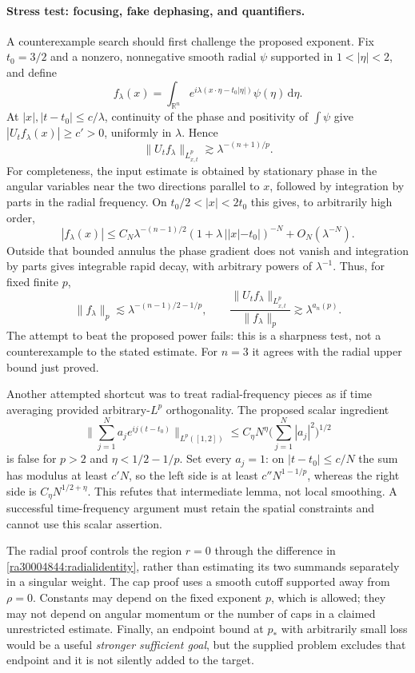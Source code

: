 \documentclass[11pt]{article}
\newcommand{\R}{\mathbb{R}}
\newcommand{\dd}{\,\mathrm d}
\begin{document}
	\paragraph{Stress test: focusing, fake dephasing, and quantifiers.}
	A counterexample search should first challenge the proposed exponent.
	Fix $t_0=3/2$ and a nonzero, nonnegative smooth radial $\psi$ supported
	in $1<|\eta|<2$, and define
	\[
	f_\lambda(x)=\int_{\R^n}
	e^{i\lambda(x\cdot\eta-t_0|\eta|)}\psi(\eta)\dd\eta.
	\]
	At $|x|,|t-t_0|\leq c/\lambda$, continuity of the phase and positivity
	of $\int\psi$ give $|U_tf_\lambda(x)|\geq c'>0$, uniformly in
	$\lambda$. Hence
	\[
	\|U_tf_\lambda\|_{L^p_{x,t}}\gtrsim\lambda^{-(n+1)/p}.
	\]
	For completeness, the input estimate is obtained by stationary phase in
	the angular variables near the two directions parallel to $x$, followed
	by integration by parts in the radial frequency. On
	$t_0/2<|x|<2t_0$ this gives, to arbitrarily high order,
	\[
	|f_\lambda(x)|\leq C_N\lambda^{-(n-1)/2}
	(1+\lambda\,||x|-t_0|)^{-N}+O_N(\lambda^{-N}).
	\]
	Outside that bounded annulus the phase gradient does not vanish and
	integration by parts gives integrable rapid decay, with arbitrary
	powers of $\lambda^{-1}$. Thus, for fixed finite $p$,
	\[
	\|f_\lambda\|_p\lesssim
	\lambda^{-(n-1)/2-1/p},\qquad
	\frac{\|U_tf_\lambda\|_{L^p_{x,t}}}{\|f_\lambda\|_p}
	\gtrsim\lambda^{a_n(p)}.
	\]
	The attempt to beat the proposed power fails: this is a sharpness test,
	not a counterexample to the stated estimate. For $n=3$ it agrees with
	the radial upper bound just proved.
	
	Another attempted shortcut was to treat radial-frequency pieces as if
	time averaging provided arbitrary-$L^p$ orthogonality. The proposed
	scalar ingredient
	\[
	\Big\|\sum_{j=1}^{N}a_je^{ij(t-t_0)}\Big\|_{L^p([1,2])}
	\leq C_\eta N^\eta\Big(\sum_{j=1}^{N}|a_j|^2\Big)^{1/2}
	\]
	is false for $p>2$ and $\eta<1/2-1/p$. Set every $a_j=1$:
	on $|t-t_0|\leq c/N$ the sum has modulus at least $c'N$, so the
	left side is at least $c''N^{1-1/p}$, whereas the right side is
	$C_\eta N^{1/2+\eta}$. This refutes that intermediate lemma, not
	local smoothing. A successful time-frequency argument must retain the
	spatial constraints and cannot use this scalar assertion.
	
	The radial proof controls the region $r=0$ through the difference in
	\eqref{ra30004844:radialidentity}, rather than estimating its two summands
	separately in a singular weight. The cap proof uses a smooth cutoff
	supported away from $\rho=0$. Constants may depend on the fixed exponent
	$p$, which is allowed; they may not depend on angular momentum or the
	number of caps in a claimed unrestricted estimate. Finally, an
	endpoint bound at $p_*$ with arbitrarily small loss would be a useful
	\emph{stronger sufficient goal}, but the supplied problem excludes that
	endpoint and it is not silently added to the target.
	
\end{document}
